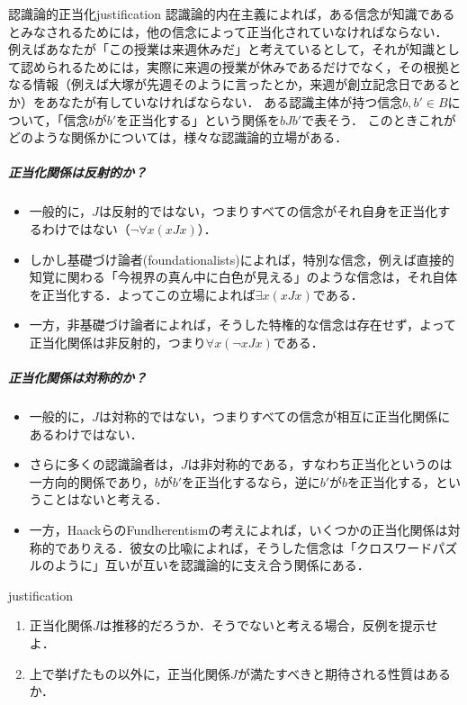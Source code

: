 \documentclass[dvipdfmx, 11pt,a4paper]{jsarticle}
\begin{document}
\begin{rei}{認識論的正当化}{justification}
 認識論的内在主義によれば，ある信念が知識であるとみなされるためには，他の信念によって正当化されていなければならない．
 例えばあなたが「この授業は来週休みだ」と考えているとして，それが知識として認められるためには，実際に来週の授業が休みであるだけでなく，その根拠となる情報（例えば大塚が先週そのように言ったとか，来週が創立記念日であるとか）をあなたが有していなければならない．
 ある認識主体が持つ信念$b, b' \in B$について，「信念$b$が$b'$を正当化する」という関係を$bJb'$で表そう．
 このときこれがどのような関係かについては，様々な認識論的立場がある．
 \subparagraph{正当化関係は反射的か？}
 \begin{itemize}
  \item 一般的に，$J$は反射的ではない，つまりすべての信念がそれ自身を正当化するわけではない（$\neg \forall x (xJx)$）．
  \item しかし基礎づけ論者(foundationalists)によれば，特別な信念，例えば直接的知覚に関わる「今視界の真ん中に白色が見える」のような信念は，それ自体を正当化する．よってこの立場によれば$\exists x (xJx)$である．
  \item 一方，非基礎づけ論者によれば，そうした特権的な信念は存在せず，よって正当化関係は非反射的，つまり$\forall x (\neg xJx)$である．
 \end{itemize}
 \subparagraph{正当化関係は対称的か？}
 \begin{itemize}
  \item 一般的に，$J$は対称的ではない，つまりすべての信念が相互に正当化関係にあるわけではない．
  \item さらに多くの認識論者は，$J$は非対称的である，すなわち正当化というのは一方向的関係であり，$b$が$b'$を正当化するなら，逆に$b'$が$b$を正当化する，ということはないと考える．
  \item 一方，HaackらのFundherentismの考えによれば，いくつかの正当化関係は対称的でありえる．彼女の比喩によれば，そうした信念は「クロスワードパズルのように」互いが互いを認識論的に支え合う関係にある．
 \end{itemize}
\end{rei}

\begin{renshu}{}{justification}
\begin{enumerate}
 \item 正当化関係$J$は推移的だろうか．そうでないと考える場合，反例を提示せよ．
 \item 上で挙げたもの以外に，正当化関係$J$が満たすべきと期待される性質はあるか．
\end{enumerate}
\end{renshu}
\end{document}

